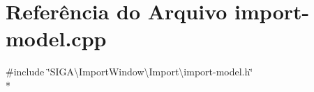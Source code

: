 \section{Referência do Arquivo import-\/model.cpp}
\label{import-model_8cpp}
{\ttfamily \#include \char`\"{}S\+I\+G\+A\textbackslash{}\+Import\+Window\textbackslash{}\+Import\textbackslash{}import-\/model.\+h\char`\"{}}\\*

